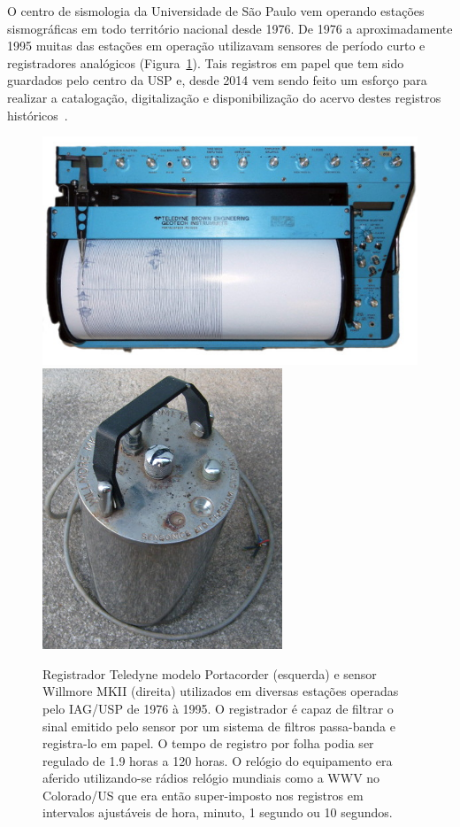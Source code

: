 \documentclass{article}
\begin{document}
O centro de sismologia da Universidade de São Paulo vem operando
estações sismográficas em todo território nacional desde 1976. De 1976
a aproximadamente 1995 muitas das estações em operação utilizavam
sensores de período curto e registradores analógicos (Figura~\ref{teledyne}). Tais
registros em papel que tem sido guardados pelo centro da USP e, desde 2014
vem sendo feito um esforço para realizar a catalogação,
digitalização e disponibilização do acervo destes registros
históricos~\cite{dados-raros}.
\begin{figure}
\begin{center}
\includegraphics[scale=0.35]{registrador.png}
\includegraphics[scale=0.35]{sensor.png}
\caption{Registrador Teledyne modelo Portacorder (esquerda) e sensor
  Willmore MKII (direita) utilizados em diversas estações operadas
  pelo IAG/USP de 1976 à 1995. O registrador é capaz de filtrar o
  sinal emitido pelo sensor por um sistema de filtros passa-banda e
  registra-lo em papel. O tempo de registro por folha podia ser
  regulado de 1.9 horas a 120 horas. O relógio do equipamento era
  aferido utilizando-se rádios relógio mundiais como a WWV no
  Colorado/US que era então super-imposto nos registros em intervalos
  ajustáveis de hora, minuto, 1 segundo ou 10 segundos.}
\label{teledyne}
\end{center}
\end{figure}
\end{document}
